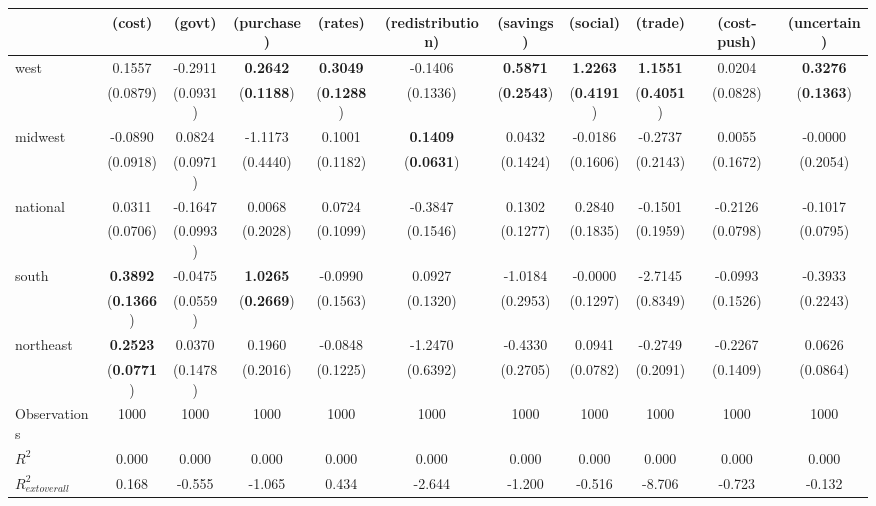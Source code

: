 \begin{tabular}{lcccccccccc}
\toprule
 & (cost) & (govt) & (purchase) & (rates) & (redistribution) & (savings) & (social) & (trade) & (cost-push) & (uncertain) \\
\midrule
west & 0.1557 & -0.2911 & \textbf{0.2642} & \textbf{0.3049} & -0.1406 & \textbf{0.5871} & \textbf{1.2263} & \textbf{1.1551} & 0.0204 & \textbf{0.3276} \\
\vspace{0.2cm}
 & (0.0879) & (0.0931) & (\textbf{0.1188}) & (\textbf{0.1288}) & (0.1336) & (\textbf{0.2543}) & (\textbf{0.4191}) & (\textbf{0.4051}) & (0.0828) & (\textbf{0.1363}) \\
midwest & -0.0890 & 0.0824 & -1.1173 & 0.1001 & \textbf{0.1409} & 0.0432 & -0.0186 & -0.2737 & 0.0055 & -0.0000 \\
\vspace{0.2cm}
 & (0.0918) & (0.0971) & (0.4440) & (0.1182) & (\textbf{0.0631}) & (0.1424) & (0.1606) & (0.2143) & (0.1672) & (0.2054) \\
national & 0.0311 & -0.1647 & 0.0068 & 0.0724 & -0.3847 & 0.1302 & 0.2840 & -0.1501 & -0.2126 & -0.1017 \\
\vspace{0.2cm}
 & (0.0706) & (0.0993) & (0.2028) & (0.1099) & (0.1546) & (0.1277) & (0.1835) & (0.1959) & (0.0798) & (0.0795) \\
south & \textbf{0.3892} & -0.0475 & \textbf{1.0265} & -0.0990 & 0.0927 & -1.0184 & -0.0000 & -2.7145 & -0.0993 & -0.3933 \\
\vspace{0.2cm}
 & (\textbf{0.1366}) & (0.0559) & (\textbf{0.2669}) & (0.1563) & (0.1320) & (0.2953) & (0.1297) & (0.8349) & (0.1526) & (0.2243) \\
northeast & \textbf{0.2523} & 0.0370 & 0.1960 & -0.0848 & -1.2470 & -0.4330 & 0.0941 & -0.2749 & -0.2267 & 0.0626 \\
\vspace{0.2cm}
 & (\textbf{0.0771}) & (0.1478) & (0.2016) & (0.1225) & (0.6392) & (0.2705) & (0.0782) & (0.2091) & (0.1409) & (0.0864) \\
\midrule
Observations & 1000 & 1000 & 1000 & 1000 & 1000 & 1000 & 1000 & 1000 & 1000 & 1000 \\
$R^2$ & 0.000 & 0.000 & 0.000 & 0.000 & 0.000 & 0.000 & 0.000 & 0.000 & 0.000 & 0.000 \\
$R^2_{	ext{overall}}$ & 0.168 & -0.555 & -1.065 & 0.434 & -2.644 & -1.200 & -0.516 & -8.706 & -0.723 & -0.132 \\
\bottomrule
\end{tabular}